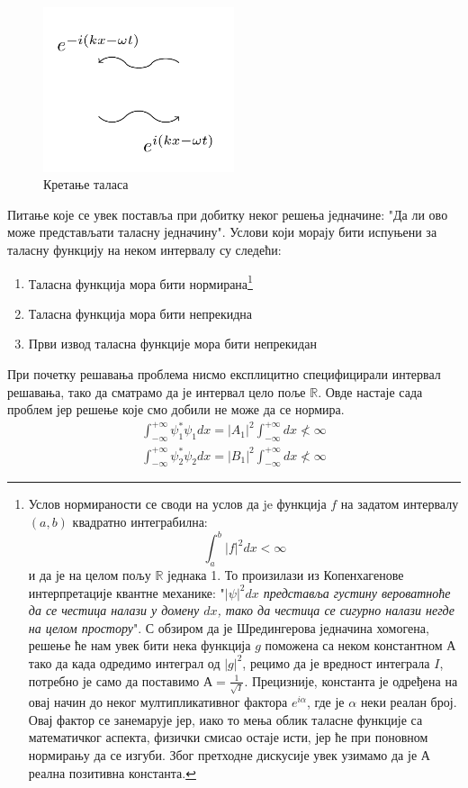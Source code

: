 \documentclass{tufte-handout} %
\theoremstyle{definition}
\theoremstyle{remark}
\newcommand{\R}{\mathbb{R}}
\begin{document}
\begin{figure}
	\centering
	\includegraphics[width=0.5\textwidth]{kretanje_talasa.png}
	\caption{Кретање таласа}
\end{figure}
Питање које се увек поставља при добитку неког решења једначине: "Да ли ово може представљати таласну једначину". Услови који морају бити испуњени за таласну функцију на неком интервалу су следећи:
\begin{enumerate}
	\item Таласна функција мора бити нормирана\footnote{Услов нормираности се своди на услов да je функција $f$ на задатом интервалу $(a,b)$ квадратно интеграбилна: \begin{equation*}
			\int_{a}^{b}|f|^2dx<\infty
	\end{equation*}
	и да је на целом пољу $\R$ једнака 1. То произилази из Копенхагенове интерпретације квантне механике: "\textit{$|\psi|^2dx$ представља густину вероватноће да се честица налази у домену $dx$, тако да честица се сигурно налази негде на целом простору}". 
	С обзиром да је Шредингерова једначина хомогена, решење ће нам увек бити нека функција $g$ поможена са неком константном $А$ тако да када одредимо интеграл од $|g|^2$, рецимо да је вредност интеграла $I$, потребно је само да поставимо $А=\frac{1}{\sqrt{I}}$. Прецизније, константа је одређена на овај начин до неког мултипликативног фактора $e^{i\alpha}$, где је $\alpha$ неки реалан број. Овај фактор се занемарује јер, иако то мења облик таласне функције са математичког аспекта, физички смисао остаје исти, јер ће при поновном нормирању да се изгуби. Због претходне дискусије увек узимамо да је $А$ реална позитивна константа.
	}
	\item Таласна функција мора бити непрекидна
	\item Први извод таласна функције мора бити непрекидан
\end{enumerate}
При почетку решавања проблема нисмо експлицитно специфицирали интервал решавања, тако да сматрамо да је интервал цело поље $\R$. Овде настаје сада проблем јер решење које смо добили не може да се нормира.
\begin{align}
	\int_{-\infty}^{+\infty}\psi_1^{\ast}\psi_1 dx = |A_1|^2\int_{-\infty}^{+\infty}dx\nless \infty\\ 
	\int_{-\infty}^{+\infty}\psi_2^{\ast}\psi_2 dx = |B_1|^2\int_{-\infty}^{+\infty}dx\nless \infty
\end{align}
\end{document}
